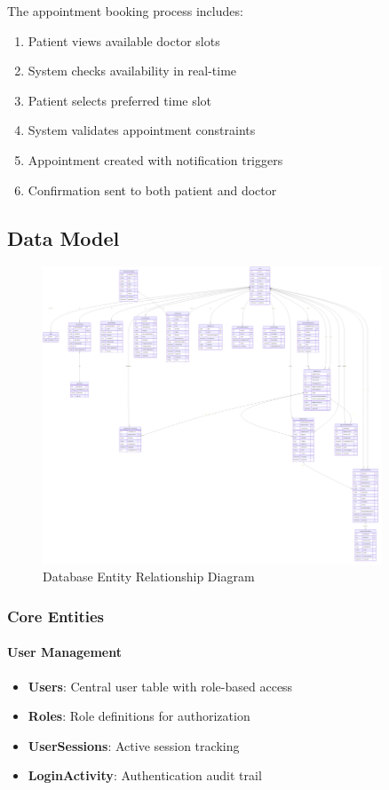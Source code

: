 \documentclass[12pt,a4paper]{article}
\begin{document}
The appointment booking process includes:
\begin{enumerate}
    \item Patient views available doctor slots
    \item System checks availability in real-time
    \item Patient selects preferred time slot
    \item System validates appointment constraints
    \item Appointment created with notification triggers
    \item Confirmation sent to both patient and doctor
\end{enumerate}

\subsection{Data Model}

\begin{figure}[H]
\centering
\includegraphics[width=0.9\textwidth]{diagrams/database_schema_erd}
\caption{Database Entity Relationship Diagram}
\label{fig:database-erd}
\end{figure}

\subsubsection{Core Entities}

\paragraph{User Management}
\begin{itemize}
    \item \textbf{Users}: Central user table with role-based access
    \item \textbf{Roles}: Role definitions for authorization
    \item \textbf{UserSessions}: Active session tracking
    \item \textbf{LoginActivity}: Authentication audit trail
\end{itemize}
\end{document}
